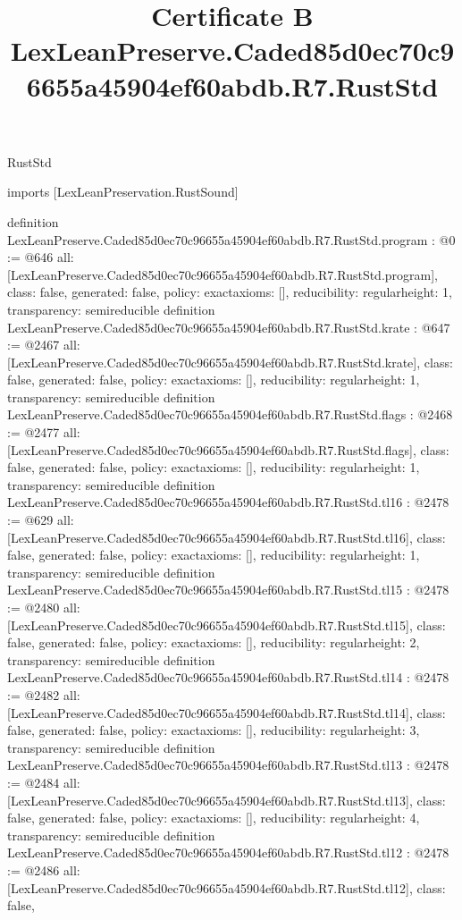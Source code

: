 \begin{lexlean}{RustStd}
\title{Certificate B LexLeanPreserve.Caded85d0ec70c96655a45904ef60abdb.R7.RustStd}
\begin{coremodule}
imports [LexLeanPreservation.RustSound]

definition LexLeanPreserve.Caded85d0ec70c96655a45904ef60abdb.R7.RustStd.program : @0 := @646 {
  all: [LexLeanPreserve.Caded85d0ec70c96655a45904ef60abdb.R7.RustStd.program],
  class: false,
  generated: false,
  policy: exact{axioms: []},
  reducibility: regular{height: 1},
  transparency: semireducible
}
definition LexLeanPreserve.Caded85d0ec70c96655a45904ef60abdb.R7.RustStd.krate : @647 := @2467 {
  all: [LexLeanPreserve.Caded85d0ec70c96655a45904ef60abdb.R7.RustStd.krate],
  class: false,
  generated: false,
  policy: exact{axioms: []},
  reducibility: regular{height: 1},
  transparency: semireducible
}
definition LexLeanPreserve.Caded85d0ec70c96655a45904ef60abdb.R7.RustStd.flags : @2468 := @2477 {
  all: [LexLeanPreserve.Caded85d0ec70c96655a45904ef60abdb.R7.RustStd.flags],
  class: false,
  generated: false,
  policy: exact{axioms: []},
  reducibility: regular{height: 1},
  transparency: semireducible
}
definition LexLeanPreserve.Caded85d0ec70c96655a45904ef60abdb.R7.RustStd.tl16 : @2478 := @629 {
  all: [LexLeanPreserve.Caded85d0ec70c96655a45904ef60abdb.R7.RustStd.tl16],
  class: false,
  generated: false,
  policy: exact{axioms: []},
  reducibility: regular{height: 1},
  transparency: semireducible
}
definition LexLeanPreserve.Caded85d0ec70c96655a45904ef60abdb.R7.RustStd.tl15 : @2478 := @2480 {
  all: [LexLeanPreserve.Caded85d0ec70c96655a45904ef60abdb.R7.RustStd.tl15],
  class: false,
  generated: false,
  policy: exact{axioms: []},
  reducibility: regular{height: 2},
  transparency: semireducible
}
definition LexLeanPreserve.Caded85d0ec70c96655a45904ef60abdb.R7.RustStd.tl14 : @2478 := @2482 {
  all: [LexLeanPreserve.Caded85d0ec70c96655a45904ef60abdb.R7.RustStd.tl14],
  class: false,
  generated: false,
  policy: exact{axioms: []},
  reducibility: regular{height: 3},
  transparency: semireducible
}
definition LexLeanPreserve.Caded85d0ec70c96655a45904ef60abdb.R7.RustStd.tl13 : @2478 := @2484 {
  all: [LexLeanPreserve.Caded85d0ec70c96655a45904ef60abdb.R7.RustStd.tl13],
  class: false,
  generated: false,
  policy: exact{axioms: []},
  reducibility: regular{height: 4},
  transparency: semireducible
}
definition LexLeanPreserve.Caded85d0ec70c96655a45904ef60abdb.R7.RustStd.tl12 : @2478 := @2486 {
  all: [LexLeanPreserve.Caded85d0ec70c96655a45904ef60abdb.R7.RustStd.tl12],
  class: false,
}
\end{coremodule}
\end{lexlean}
